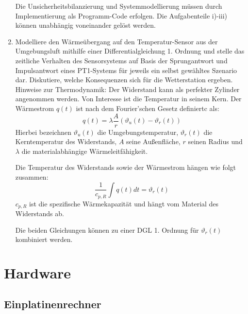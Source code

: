 \documentclass{article}
\begin{document}
\begin{enumerate}
Die Unsicherheitsbilanzierung und Systemmodellierung müssen durch Implementierung als Programm-Code
erfolgen.
Die Aufgabenteile i)-iii) können unabhängig voneinander gelöst werden.
\item Modelliere den Wärmeübergang auf den Temperatur-Sensor aus der Umgebungsluft mithilfe einer
Differentialgleichung 1. Ordnung und stelle das zeitliche Verhalten des Sensorsystems auf Basis der
Sprungantwort und Impulsantwort eines PT1-Systems für jeweils ein selbst gewähltes Szenario dar. Diskutiere,
welche Konsequenzen sich für die Wetterstation ergeben.
Hinweise zur Thermodynamik: Der Widerstand kann als perfekter Zylinder angenommen werden. Von
Interesse ist die Temperatur in seinem Kern. Der Wärmestrom \begin{math} q\left(t\right)\end{math} ist nach dem Fourier’schen Gesetz definiertc als:
\begin{displaymath}
q\left(t\right) = \lambda \frac{A}{r} \left(\vartheta_u\left(t\right) - \vartheta_r\left(t\right) \right)
\end{displaymath}
Hierbei bezeichnen $\vartheta_u\left(t\right)$ die Umgebungstemperatur, $\vartheta_r\left(t\right)$ die Kerntemperatur des Widerstands, $A$ seine Außenfläche, $r$ seinen Radius und $\lambda$ die materialabhängige Wärmeleitfähigkeit. 

Die Temperatur des Widerstands sowie der Wärmestrom hängen wie folgt zusammen:
\[
\frac{1}{c_{p,R}}\int{q\left(t\right) dt} = \vartheta_r\left(t\right)
\]
$c_{p,R}$ ist die spezifische Wärmekapazität und hängt vom Material des Widerstands ab. 

Die beiden Gleichungen können zu einer DGL 1. Ordnung für $\vartheta_r\left(t\right)$ kombiniert werden.

\end{enumerate}

\section{Hardware}
\subsection{Einplatinenrechner}
\end{document}
